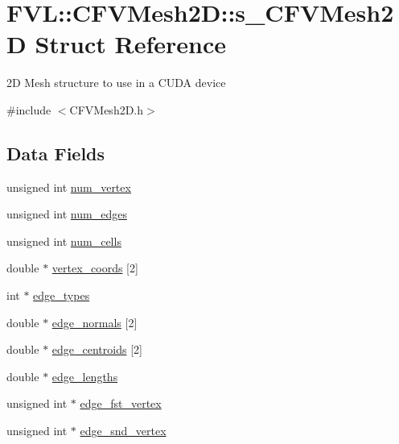 \hypertarget{structFVL_1_1CFVMesh2D_1_1s__CFVMesh2D}{
\section{FVL::CFVMesh2D::s\_\-CFVMesh2D Struct Reference}
\label{da/d6f/structFVL_1_1CFVMesh2D_1_1s__CFVMesh2D}
}


2D Mesh structure to use in a CUDA device  




{\ttfamily \#include $<$CFVMesh2D.h$>$}

\subsection*{Data Fields}
\begin{DoxyCompactItemize}
\item 
unsigned int \hyperlink{structFVL_1_1CFVMesh2D_1_1s__CFVMesh2D_a338044b4e98884f1c4405352536a83c4}{num\_\-vertex}
\item 
unsigned int \hyperlink{structFVL_1_1CFVMesh2D_1_1s__CFVMesh2D_a2d742f260aeff149f645c125ef17c97b}{num\_\-edges}
\item 
unsigned int \hyperlink{structFVL_1_1CFVMesh2D_1_1s__CFVMesh2D_a1c6b6a7f5071a2bfe7bd5a23061a3db6}{num\_\-cells}
\item 
double $\ast$ \hyperlink{structFVL_1_1CFVMesh2D_1_1s__CFVMesh2D_a9a22e241caf438470a98dfdef6b43797}{vertex\_\-coords} \mbox{[}2\mbox{]}
\item 
int $\ast$ \hyperlink{structFVL_1_1CFVMesh2D_1_1s__CFVMesh2D_a39c8e42575a4c1ad17b17b9cca3389fb}{edge\_\-types}
\item 
double $\ast$ \hyperlink{structFVL_1_1CFVMesh2D_1_1s__CFVMesh2D_a40ae6a2aeddd8ae22b210c3c5551044f}{edge\_\-normals} \mbox{[}2\mbox{]}
\item 
double $\ast$ \hyperlink{structFVL_1_1CFVMesh2D_1_1s__CFVMesh2D_ad9a605d4840c19468d8a4b15f8588cf2}{edge\_\-centroids} \mbox{[}2\mbox{]}
\item 
double $\ast$ \hyperlink{structFVL_1_1CFVMesh2D_1_1s__CFVMesh2D_ada1058ae4bf4ec15205639f0f53b396c}{edge\_\-lengths}
\item 
unsigned int $\ast$ \hyperlink{structFVL_1_1CFVMesh2D_1_1s__CFVMesh2D_a1056b04882b7cee50a1abf8f670d0bd4}{edge\_\-fst\_\-vertex}
\item 
unsigned int $\ast$ \hyperlink{structFVL_1_1CFVMesh2D_1_1s__CFVMesh2D_aef47aae58ae276b244fd11c9d6878dff}{edge\_\-snd\_\-vertex}
\item 

\end{DoxyCompactItemize}
